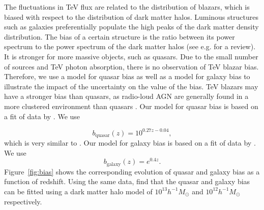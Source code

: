 \documentclass[numberedappendix]{emulateapj}
\newcommand\Cc[1]{{\color{blue} \bf #1}} %
\begin{document}
The fluctuations in TeV flux are related to the distribution of blazars, which is biased with respect to the distribution of dark matter halos. Luminous structures such as galaxies preferentially populate the high peaks of the dark matter density distribution. The bias of a certain structure is the ratio between its power spectrum to the power spectrum of the dark matter halos (see e.g. \citet{2002PhR...372....1C} for a review). It is stronger for more massive objects, such as quasars.
Due to the small number of sources and TeV photon absorption, there is no observation of TeV blazar bias.  Therefore, we  use a model for quasar bias as well as a model for galaxy bias to illustrate the impact of the uncertainty on the value of the bias.  TeV blazars may have a stronger bias than quasars, as radio-loud AGN are generally found in a more clustered environment than quasars \citep{2009MNRAS.393..377M,2012MNRAS.421.3060S}. Our model for quasar bias is based on a fit of data by \citet{2005MNRAS.356..415C,2007ApJ...658...85M,2007AJ....133.2222S}. We use

  \begin{equation}
    \label{eq:qso_bias}
    b_{\mathrm{quasar}}(z)=10^{0.27z-0.04},
  \end{equation}
which is very similar to \citet{2012MNRAS.422..106P}. Our model for galaxy bias is based on a fit of data by \citet{2005A&A...442..801M,1998ApJ...492..428S,2006ApJ...637..631K}. We use
  \begin{equation}
    \label{eq:qso_bias}
    b_{\mathrm{galaxy}}(z)=e^{0.4 z}.
  \end{equation}
Figure~\ref{fig:bias} shows the corresponding evolution of quasar and galaxy bias as a function of redshift. Using the same data, \citet{2008ApJ...678..627B} find that the quasar and galaxy bias can be fitted using a dark matter halo model of  $10^{13}h^{-1}M_{\odot}$ and $10^{12}h^{-1} M_{\odot}$ respectively. 

\end{document}
